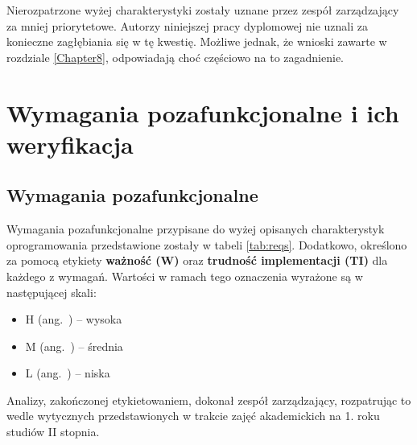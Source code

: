 Nierozpatrzone wyżej charakterystyki zostały uznane przez zespół zarządzający za mniej priorytetowe. Autorzy niniejszej pracy dyplomowej nie uznali za konieczne zagłębiania się w tę kwestię. Możliwe jednak, że wnioski zawarte w rozdziale \ref{Chapter8}, odpowiadają choć częściowo na to zagadnienie.

\section{Wymagania pozafunkcjonalne i ich weryfikacja}
\label{Chapter43}

\subsection{Wymagania pozafunkcjonalne}
\label{Chapter431}

Wymagania pozafunkcjonalne przypisane do wyżej opisanych charakterystyk oprogramowania przedstawione zostały w tabeli \ref{tab:reqs}. Dodatkowo, określono za pomocą etykiety \textbf{ważność (W)} oraz \textbf{trudność implementacji (TI)} dla każdego z wymagań. Wartości w ramach tego oznaczenia wyrażone są w następującej skali:

\begin{itemize}
\item{H (ang.~) -- wysoka}
\item{M (ang.~) -- średnia}
\item{L (ang.~) -- niska}
\end{itemize}

Analizy, zakończonej etykietowaniem, dokonał zespół zarządzający, rozpatrując to wedle wytycznych przedstawionych w trakcie zajęć akademickich na 1. roku studiów II stopnia.

